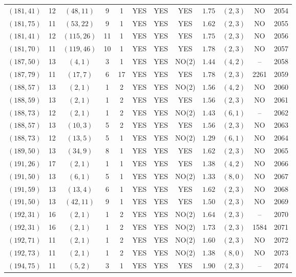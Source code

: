 \begin{longtable}{|c|c|c|c|c|c|c|c|c|c|c|c|}
$(181,41)$ & 12 & $(48,11)$ & 9 & 1 & YES & YES & YES & $1.75$ & $(2,3)$ & NO & 2054\\
$(181,75)$ & 11 & $(53,22)$ & 9 & 1 & YES & YES & YES & $1.62$ & $(2,3)$ & NO & 2055\\
$(181,41)$ & 12 & $(115,26)$ & 11 & 1 & YES & YES & YES & $1.75$ & $(2,3)$ & NO & 2056\\
$(181,70)$ & 11 & $(119,46)$ & 10 & 1 & YES & YES & YES & $1.78$ & $(2,3)$ & NO & 2057\\
$(187,50)$ & 13 & $(4,1)$ & 3 & 1 & YES & YES & NO(2) & $1.44$ & $(4,2)$ & -- & 2058\\
$(187,79)$ & 11 & $(17,7)$ & 6 & 17 & YES & YES & YES & $1.78$ & $(2,3)$ & 2261 & 2059\\
$(188,57)$ & 13 & $(2,1)$ & 1 & 2 & YES & YES & NO(2) & $1.56$ & $(4,2)$ & NO & 2060\\
$(188,59)$ & 13 & $(2,1)$ & 1 & 2 & YES & YES & YES & $1.56$ & $(2,3)$ & NO & 2061\\
$(188,73)$ & 12 & $(2,1)$ & 1 & 2 & YES & YES & NO(2) & $1.43$ & $(6,1)$ & -- & 2062\\
$(188,57)$ & 13 & $(10,3)$ & 5 & 2 & YES & YES & YES & $1.56$ & $(2,3)$ & NO & 2063\\
$(188,73)$ & 12 & $(13,5)$ & 5 & 1 & YES & YES & NO(2) & $1.29$ & $(6,1)$ & NO & 2064\\
$(189,50)$ & 13 & $(34,9)$ & 8 & 1 & YES & YES & YES & $1.62$ & $(2,3)$ & NO & 2065\\
$(191,26)$ & 17 & $(2,1)$ & 1 & 1 & YES & YES & YES & $1.38$ & $(4,2)$ & NO & 2066\\
$(191,50)$ & 13 & $(6,1)$ & 5 & 1 & YES & YES & NO(2) & $1.33$ & $(8,0)$ & NO & 2067\\
$(191,59)$ & 13 & $(13,4)$ & 6 & 1 & YES & YES & YES & $1.62$ & $(2,3)$ & NO & 2068\\
$(191,50)$ & 13 & $(42,11)$ & 9 & 1 & YES & YES & YES & $1.50$ & $(2,3)$ & NO & 2069\\
$(192,31)$ & 16 & $(2,1)$ & 1 & 2 & YES & YES & NO(2) & $1.64$ & $(2,3)$ & -- & 2070\\
$(192,31)$ & 16 & $(2,1)$ & 1 & 2 & YES & YES & NO(2) & $1.73$ & $(2,3)$ & 1584 & 2071\\
$(192,71)$ & 11 & $(2,1)$ & 1 & 2 & YES & YES & NO(2) & $1.60$ & $(2,3)$ & NO & 2072\\
$(192,73)$ & 11 & $(2,1)$ & 1 & 2 & YES & YES & NO(2) & $1.38$ & $(8,0)$ & NO & 2073\\
$(194,75)$ & 11 & $(5,2)$ & 3 & 1 & YES & YES & YES & $1.90$ & $(2,3)$ & -- & 2074\\

\end{longtable}
